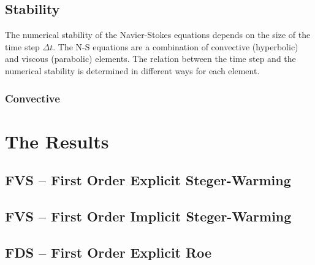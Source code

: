 \documentclass[11pt, a4paper]{article}
\begin{document}
\subsection{Stability}
The numerical stability of the Navier-Stokes equations depends on the size of the time step $\Delta t$. The N-S equations are a combination of convective (hyperbolic) and viscous (parabolic) elements. The relation between the time step and the numerical stability is determined in different ways for each element.

\subsubsection{Convective }

\section{The Results}
\subsection{FVS -- First Order Explicit Steger-Warming}
\subsection{FVS -- First Order Implicit Steger-Warming}
\subsection{FDS -- First Order Explicit Roe}
\end{document}
